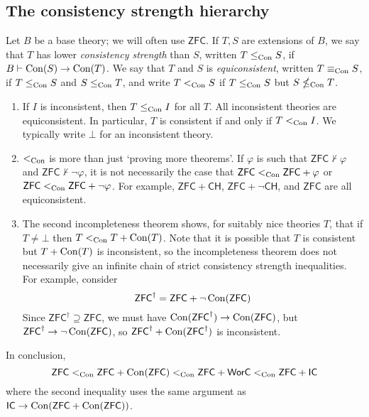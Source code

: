 \subsection{The consistency strength hierarchy}
Let \( B \) be a base theory; we will often use \( \mathsf{ZFC} \).
If \( T, S \) are extensions of \( B \), we say that \( T \) has lower \emph{consistency strength} than \( S \), written \( T \leq_{\operatorname{Con}} S \), if \( B \vdash \operatorname{Con}(S) \to \operatorname{Con}(T) \).
We say that \( T \) and \( S \) is \emph{equiconsistent}, written \( T \equiv_{\operatorname{Con}} S \), if \( T \leq_{\operatorname{Con}} S \) and \( S \leq_{\operatorname{Con}} T \), and write \( T <_{\operatorname{Con}} S \) if \( T \leq_{\operatorname{Con}} S \) but \( S \nleq_{\operatorname{Con}} T \).
\begin{remark}
    \begin{enumerate}
        \item If \( I \) is inconsistent, then \( T \leq_{\operatorname{Con}} I \) for all \( T \).
        All inconsistent theories are equiconsistent.
        In particular, \( T \) is consistent if and only if \( T <_{\operatorname{Con}} I \).
        We typically write \( \bot \) for an inconsistent theory.
        \item \( <_{\operatorname{Con}} \) is more than just `proving more theorems'.
        If \( \varphi \) is such that \( \mathsf{ZFC} \nvdash \varphi \) and \( \mathsf{ZFC} \nvdash \neg\varphi \), it is not necessarily the case that \( \mathsf{ZFC} <_{\operatorname{Con}} \mathsf{ZFC} + \varphi \) or \( \mathsf{ZFC} <_{\operatorname{Con}} \mathsf{ZFC} + \neg\varphi \).
        For example, \( \mathsf{ZFC} + \mathsf{CH} \), \( \mathsf{ZFC} + \neg\mathsf{CH} \), and \( \mathsf{ZFC} \) are all equiconsistent.
        \item The second incompleteness theorem shows, for suitably nice theories \( T \), that if \( T \neq \bot \) then \( T <_{\operatorname{Con}} T + \operatorname{Con}(T) \).
        Note that it is possible that \( T \) is consistent but \( T + \operatorname{Con}(T) \) is inconsistent, so the incompleteness theorem does not necessarily give an infinite chain of strict consistency strength inequalities.
        For example, consider
        \[ \mathsf{ZFC}^\dagger = \mathsf{ZFC} + \neg\operatorname{Con}(\mathsf{ZFC}) \]
        Since \( \mathsf{ZFC}^\dagger \supseteq \mathsf{ZFC} \), we must have \( \operatorname{Con}(\mathsf{ZFC}^\dagger) \to \operatorname{Con}(\mathsf{ZFC}) \), but \( \mathsf{ZFC}^\dagger \to \neg\operatorname{Con}(\mathsf{ZFC}) \), so \( \mathsf{ZFC}^\dagger + \operatorname{Con}(\mathsf{ZFC}^\dagger) \) is inconsistent.
    \end{enumerate}
\end{remark}
In conclusion,
\[ \mathsf{ZFC} <_{\operatorname{Con}} \mathsf{ZFC} + \operatorname{Con}(\mathsf{ZFC}) <_{\operatorname{Con}} \mathsf{ZFC} + \mathsf{WorC} <_{\operatorname{Con}} \mathsf{ZFC} + \mathsf{IC} \]
where the second inequality uses the same argument as \( \mathsf{IC} \to \operatorname{Con}(\mathsf{ZFC} + \operatorname{Con}(\mathsf{ZFC})) \).

